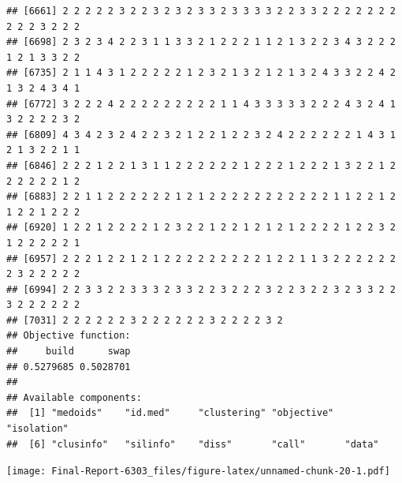 \documentclass[
]{article}
\newenvironment{Shaded}{\begin{snugshade}}{\end{snugshade}}
\newcommand{\AttributeTok}[1]{\textcolor[rgb]{0.13,0.29,0.53}{#1}}
\newcommand{\ConstantTok}[1]{\textcolor[rgb]{0.56,0.35,0.01}{#1}}
\newcommand{\DecValTok}[1]{\textcolor[rgb]{0.00,0.00,0.81}{#1}}
\newcommand{\FunctionTok}[1]{\textcolor[rgb]{0.13,0.29,0.53}{\textbf{#1}}}
\newcommand{\NormalTok}[1]{#1}
\newcommand{\SpecialCharTok}[1]{\textcolor[rgb]{0.81,0.36,0.00}{\textbf{#1}}}
\newcommand{\StringTok}[1]{\textcolor[rgb]{0.31,0.60,0.02}{#1}}
\begin{document}
\begin{verbatim}
## [6661] 2 2 2 2 2 3 2 2 3 2 3 2 3 3 2 3 3 3 3 2 2 3 3 2 2 2 2 2 2 2 2 2 2 3 2 2 2
## [6698] 2 3 2 3 4 2 2 3 1 1 3 3 2 1 2 2 2 1 1 2 1 3 2 2 3 4 3 2 2 2 1 2 1 3 3 2 2
## [6735] 2 1 1 4 3 1 2 2 2 2 2 1 2 3 2 1 3 2 1 2 1 3 2 4 3 3 2 2 4 2 1 3 2 4 3 4 1
## [6772] 3 2 2 2 4 2 2 2 2 2 2 2 2 2 1 1 4 3 3 3 3 3 2 2 2 4 3 2 4 1 3 2 2 2 2 3 2
## [6809] 4 3 4 2 3 2 4 2 2 3 2 1 2 2 1 2 2 3 2 4 2 2 2 2 2 2 1 4 3 1 2 1 3 2 2 1 1
## [6846] 2 2 2 1 2 2 1 3 1 1 2 2 2 2 2 2 1 2 2 2 1 2 2 2 1 3 2 2 1 2 2 2 2 2 2 1 2
## [6883] 2 2 1 1 2 2 2 2 2 2 1 2 1 2 2 2 2 2 2 2 2 2 2 2 1 1 2 2 1 2 1 2 2 1 2 2 2
## [6920] 1 2 2 1 2 2 2 2 1 2 3 2 2 1 2 2 1 2 1 2 1 2 2 2 2 1 2 2 3 2 1 2 2 2 2 2 1
## [6957] 2 2 2 1 2 2 1 2 1 2 2 2 2 2 2 2 2 2 1 2 2 1 1 3 2 2 2 2 2 2 2 3 2 2 2 2 2
## [6994] 2 2 3 3 2 2 3 3 3 2 3 3 2 2 3 2 2 2 3 2 2 3 2 2 3 2 3 3 2 2 3 2 2 2 2 2 2
## [7031] 2 2 2 2 2 2 3 2 2 2 2 2 2 3 2 2 2 2 3 2
## Objective function:
##     build      swap 
## 0.5279685 0.5028701 
## 
## Available components:
##  [1] "medoids"    "id.med"     "clustering" "objective"  "isolation" 
##  [6] "clusinfo"   "silinfo"    "diss"       "call"       "data"
\end{verbatim}

\begin{Shaded}
\end{Shaded}

\texttt{[image: Final-Report-6303\_files/figure-latex/unnamed-chunk-20-1.pdf]}

\begin{Shaded}
\end{Shaded}
\end{document}
